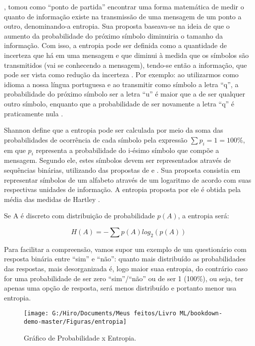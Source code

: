 \documentclass[
]{book}
\begin{document}
\citet{shannon1948mathematical}, tomou como ``ponto de partida'' encontrar uma forma matemática de medir o quanto de informação existe na transmissão de uma mensagem de um ponto a outro, denominando-a entropia. Sua proposta baseava-se na ideia de que o aumento da probabilidade do próximo símbolo diminuiria o tamanho da informação. Com isso, a entropia pode ser definida como a quantidade de incerteza que há em uma mensagem e que diminui à medida que os símbolos são transmitidos (vai se conhecendo a mensagem), tendo-se então a informação, que pode ser vista como redução da incerteza \citep{shannon1948mathematical, paviotti2019consideraccoes}. Por exemplo: ao utilizarmos como idioma a nossa língua portuguesa e ao transmitir como símbolo a letra ``q'', a probabilidade do próximo símbolo ser a letra ``u'' é maior que a de ser qualquer outro símbolo, enquanto que a probabilidade de ser novamente a letra ``q'' é praticamente nula \citep{paviotti2019consideraccoes}.

Shannon define que a entropia pode ser calculada por meio da soma das probabilidades de ocorrência de cada símbolo pela expressão \(∑ p_i = 1 = 100\%\), em que \(p_i\) representa a probabilidade do i-ésimo símbolo que compõe a mensagem. Segundo ele, estes símbolos devem ser representados através de sequências binárias, utilizando das propostas de \citet{nyquist1924certain} e \citet{hartley1928transmission}. Sua proposta consistia em representar símbolos de um alfabeto através de um logaritmo de acordo com suas respectivas unidades de informação. A entropia proposta por ele é obtida pela média das medidas de Hartley \citep{moser2012student}.

Se A é discreto com distribuição de probabilidade \(p(A)\), a entropia será:

\begin{equation} 
  H(A)=- \sum p(A)log_2(p(A)) 
  \label{eq:entropia}
\end{equation}

Para facilitar a compreensão, vamos supor um exemplo de um questionário com resposta binária entre ``sim'' e ``não'': quanto mais distribuído as probabilidades das respostas, mais desorganizada é, logo maior suaa entropia, do contrário caso for uma probabilidade de ser zero ``sim''/``não'' ou de ser 1 (100\%), ou seja, ter apenas uma opção de resposta, será menos distribuído e portanto menor usa entropia.

\begin{figure}

{\centering \texttt{[image: G:/Hiro/Documents/Meus feitos/Livro ML/bookdown-demo-master/Figuras/entropia]} 

}

\caption{Gráfico de Probabilidade x Entropia.}\label{fig:entropia}
\end{figure}
\end{document}
